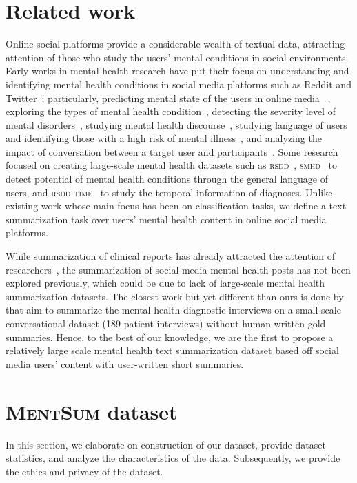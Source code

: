 \documentclass[10pt, a4paper]{article}
\newcommand{\mentsum}{\textsc{MentSum}}
\begin{document}
 \section{Related work} 


Online social platforms provide a considerable wealth of textual data, attracting attention of those who study the users' mental conditions in social environments. 
Early works in mental health research have put their focus on understanding and identifying mental health conditions in social media platforms such as Reddit and Twitter~\cite{Choudhury2013PredictingDV,Resnik2013UsingTM,Coppersmith2014MeasuringPT,Mowery2017UnderstandingDS}; particularly, predicting mental state of the users in online media ~\cite{Hao2013PredictingMH,Wang2013AnIM,Mowery2017FeatureST}, exploring the types of mental health condition~\cite{Wilson2014FindingIA}, detecting the severity level of mental disorders~\cite{ODea2015DetectingSO,Chancellor2016QuantifyingAP}, studying mental health discourse~\cite{Choudhury2014MentalHD}, studying language of users and identifying those with a high risk of mental illness~\cite{Milne2016CLPsych2S,Cohan2017TriagingCS}, and analyzing the impact of conversation between a target user and participants~\cite{soldaini-etal-2018-helping}. Some research focused on creating large-scale mental health datasets such as \textsc{rsdd}~\cite{Yates2017DepressionAS}, \textsc{smhd}~\cite{Cohan2018SMHDAL} to detect potential of mental health conditions through the general language of users, and \textsc{rsdd-time}~\cite{MacAvaney2018RSDDTimeTA} to study the temporal information of diagnoses. Unlike existing work whose main focus has been on classification tasks, we define a text summarization task over users' mental health content in online social media platforms. 

While summarization of clinical reports has already attracted the attention of researchers~\cite{Mishra2014TextSI,Goldstein2016AnAK,MacAvaney2019OntologyAwareCA,Zhang2020OptimizingTF,Sotudeh2020AttendTM}, the summarization of social media mental health posts has not been explored previously, which could be due to lack of large-scale mental health summarization datasets. The closest work but yet different than ours is done by  that aim to summarize the mental health diagnostic interviews on a small-scale conversational dataset (189 patient interviews) without human-written gold summaries. Hence, to the best of our knowledge, we are the first to propose a relatively large scale mental health text summarization dataset based off social media users' content with user-written short summaries. \section{\mentsum{} dataset}
In this section, we elaborate on construction of our dataset, provide dataset statistics, and analyze the characteristics of the data. Subsequently, we provide the ethics and privacy of the dataset. 
\end{document}
